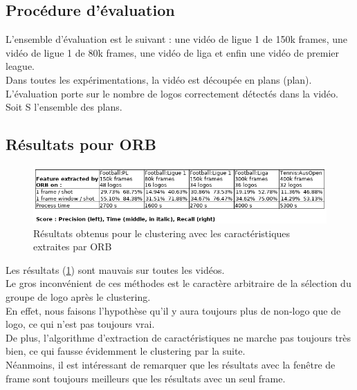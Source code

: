 \documentclass[11pt]{article}
\begin{document}
\subsection{Procédure d'évaluation}
\label{sec:org58df650}
L'ensemble d'évaluation est le suivant : une vidéo de ligue 1 de 150k frames, une vidéo de ligue 1 de 80k frames, une vidéo de liga et enfin une vidéo de premier league.\\
Dans toutes les expérimentations, la vidéo est découpée en plans (plan). L'évaluation porte sur le nombre de logos correctement détectés dans la vidéo.\\
Soit S l'ensemble des plans.\\

\subsection{Résultats pour ORB}
\label{sec:org4955d39}
\begin{figure}[htbp]
\centering
\includegraphics[width=15cm]{res_orb.png}
\caption{Résultats obtenus pour le clustering avec les caractéristiques extraites par ORB \label{orb-res}}
\end{figure}

Les résultats (\ref{orb-res}) sont mauvais sur toutes les vidéos.\\
Le gros inconvénient de ces méthodes est le caractère arbitraire de la sélection du groupe de logo après le clustering.\\
En effet, nous faisons l'hypothèse qu'il y aura toujours plus de non-logo que de logo, ce qui n'est pas toujours vrai.\\
De plus, l'algorithme d'extraction de caractéristiques ne marche pas toujours très bien, ce qui fausse évidemment le clustering par la suite.\\

Néanmoins, il est intéressant de remarquer que les résultats avec la fenêtre de frame sont toujours meilleurs que les résultats avec un seul frame.\\
\end{document}
